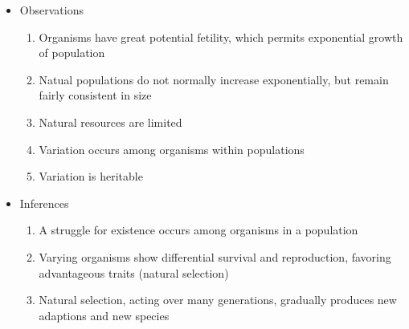 \documentclass[12pt]{article}
\begin{document}
\begin{itemize}
\begin{itemize}
\begin{itemize}
                \begin{itemize}
                    \item Observations
                    \begin{enumerate}
                        \item Organisms have great potential fetility, which permits exponential growth of population
                        \item Natual populations do not normally increase exponentially, but remain fairly consistent in size
                        \item Natural resources are limited
                        \item Variation occurs among organisms within populations
                        \item Variation is heritable
                    \end{enumerate}
                    \item Inferences
                    \begin{enumerate}
                        \item A struggle for existence occurs among organisms in a population
                        \item Varying organisms show differential survival and reproduction, favoring advantageous traits (natural selection)
                        \item Natural selection, acting over many generations, gradually produces new adaptions and new species
                    \end{enumerate}
                \end{itemize}
            \end{itemize}
        \end{itemize}
    \end{itemize}
\end{document}
